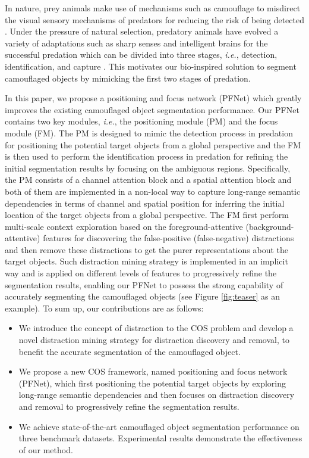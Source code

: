 \documentclass[final]{cvpr}
\begin{document}
In nature, prey animals make use of mechanisms such as camouflage to misdirect the visual sensory mechanisms of predators for reducing the risk of being detected \cite{stevens2009animal}. Under the pressure of natural selection, predatory animals have evolved a variety of adaptations such as sharp senses and intelligent brains for the successful predation which can be divided into three stages, \emph{i.e.}, detection, identification, and capture \cite{hall2013camouflage}. This motivates our bio-inspired solution to segment camouflaged objects by mimicking the first two stages of predation.

In this paper, we propose a positioning and focus network (PFNet) which greatly improves the existing camouflaged object segmentation performance. Our PFNet contains two key modules, \emph{i.e.}, the positioning module (PM) and the focus module (FM). The PM is designed to mimic the detection process in predation for positioning the potential target objects from a global perspective and the FM is then used to perform the identification process in predation for refining the initial segmentation results by focusing on the ambiguous regions.
Specifically, the PM consists of a channel attention block and a spatial attention block and both of them are implemented in a non-local way to capture long-range semantic dependencies in terms of channel and spatial position for inferring the initial location of the target objects from a global perspective.
The FM first perform multi-scale context exploration based on the foreground-attentive (background-attentive) features for discovering the false-positive (false-negative) distractions and then remove these distractions to get the purer representations about the target objects. Such distraction mining strategy is implemented in an implicit way and is applied on different levels of features to progressively refine the segmentation results, enabling our PFNet to possess the strong capability of accurately segmenting the camouflaged objects (see Figure \ref{fig:teaser} as an example).
To sum up, our contributions are as follows:
\begin{itemize}
	\item We introduce the concept of distraction to the COS problem and develop a novel distraction mining strategy for distraction discovery and removal, to benefit the accurate segmentation of the camouflaged object.
	\item We propose a new COS framework, named positioning and focus network (PFNet), which first positioning the potential target objects by exploring long-range semantic dependencies and then focuses on distraction discovery and removal to progressively refine the segmentation results.
	\item We achieve state-of-the-art camouflaged object segmentation performance on three benchmark datasets. Experimental results demonstrate the effectiveness of our method.
\end{itemize}
\end{document}
